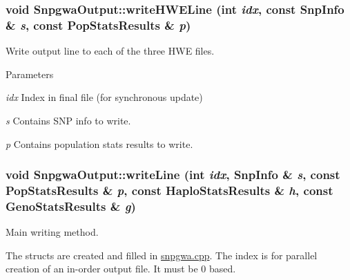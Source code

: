 \label{classSnpgwaOutput_a2090144186c1c1a6a832c36094661087}
\hypertarget{classSnpgwaOutput_a9af518ccbe41e8cf1a2c91738ed1c5b6}{
\subsubsection[{writeHWELine}]{\setlength{\rightskip}{0pt plus 5cm}void SnpgwaOutput::writeHWELine (int {\em idx}, \/  const {\bf SnpInfo} \& {\em s}, \/  const {\bf PopStatsResults} \& {\em p})}}
\label{classSnpgwaOutput_a9af518ccbe41e8cf1a2c91738ed1c5b6}
Write output line to each of the three HWE files.


\begin{DoxyParams}{Parameters}
\item[{\em idx}]Index in final file (for synchronous update) \item[{\em s}]Contains SNP info to write. \item[{\em p}]Contains population stats results to write. \end{DoxyParams}
\hypertarget{classSnpgwaOutput_a24ceac8c558ceeee26925f67d64498a4}{
\subsubsection[{writeLine}]{\setlength{\rightskip}{0pt plus 5cm}void SnpgwaOutput::writeLine (int {\em idx}, \/  {\bf SnpInfo} \& {\em s}, \/  const {\bf PopStatsResults} \& {\em p}, \/  const {\bf HaploStatsResults} \& {\em h}, \/  const {\bf GenoStatsResults} \& {\em g})}}
\label{classSnpgwaOutput_a24ceac8c558ceeee26925f67d64498a4}
Main writing method.

The structs are created and filled in \hyperlink{snpgwa_8cpp}{snpgwa.cpp}. The index is for parallel creation of an in-\/order output file. It must be 0 based.

